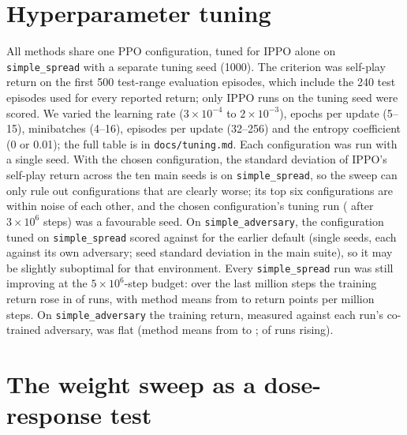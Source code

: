 \section{Hyperparameter tuning}
\label{app:tuning}

All methods share one PPO configuration, tuned for IPPO alone on
\texttt{simple\_spread} with a separate tuning seed (1000). The criterion was
self-play return on the first 500 test-range evaluation episodes, which include
the 240 test episodes used for every reported return; only IPPO runs on the
tuning seed were scored. We varied the learning rate ($3{\times}10^{-4}$ to
$2{\times}10^{-3}$), epochs per update (5--15), minibatches (4--16), episodes per
update (32--256) and the entropy coefficient (0 or 0.01); the full table is in
\texttt{docs/tuning.md}. Each configuration was run with a single seed. With
the chosen configuration, the standard deviation of IPPO's self-play return
across the ten main seeds is \SpreadIPPOSPsd{} on \texttt{simple\_spread}, so
the sweep can only rule out configurations that are clearly worse; its top six
configurations are within noise of each other, and the chosen configuration's
tuning run (\TuneSpreadChosen{} after $3\times10^6$ steps) was a favourable
seed. On \texttt{simple\_adversary}, the configuration tuned on
\texttt{simple\_spread} scored \TuneAdversaryChosen{} against
\TuneAdversaryOther{} for the earlier default (single seeds, each against its
own adversary; seed standard deviation \AdversaryIPPOSPsd{} in the main
suite), so it may be slightly suboptimal for that environment. Every \texttt{simple\_spread} run was still
improving at the $5\times10^6$-step budget: over the last million steps the
training return rose in \SpreadSlopePos{} of \SpreadSlopeN{} runs, with method
means from \SpreadSlopeLo{} to \SpreadSlopeHi{} return points per million steps.
On \texttt{simple\_adversary} the training return, measured against each run's
co-trained adversary, was flat (method means from \AdversarySlopeLo{} to
\AdversarySlopeHi{}; \AdversarySlopePos{} of \AdversarySlopeN{} runs rising).

\section{The weight sweep as a dose-response test}
\label{app:lambda}

\begin{table}[h]
\centering
\caption{The $\lambda$ sweep on the selection seeds (100--104, five runs per
row), scored on the validation episodes. IPPO trained on the same seeds is the
$\lambda=0$ end point; it was added after the main \texttt{simple\_spread}
results had been seen and was not a selection candidate. Intervals are 95\%
bootstrap intervals over runs.}
\label{tab:lambda}
\resizebox{\linewidth}{!}{}
\end{table}

